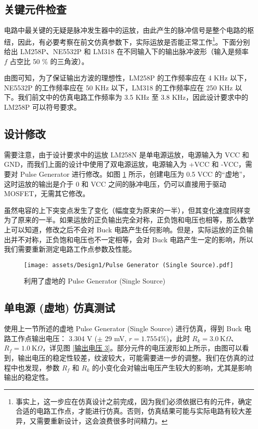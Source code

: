 \documentclass[UTF8]{article}
\def\kO{\ \mathrm{K}\Omega}
\def\kO{\ \mathrm{K}\Omega}
\theoremstyle{MyLineTheoremStyle} %
\theoremstyle{MyBlockTheoremStyle} %
\theoremstyle{MySubsubsectionStyle} %
\begin{document}
\subsection{关键元件检查}
电路中最关键的无疑是脉冲发生器中的运放，由此产生的脉冲信号是整个电路的枢纽，因此，有必要考察在前文仿真参数下，实际运放是否能正常工作\footnote{事实上，这一步应在仿真设计之前完成，因为我们必须依据已有的元件，确定合适的电路工作点，才能进行仿真。否则，仿真结果可能与实际电路有较大差异，又需要重新设计，这会浪费很多时间精力。}。下面分别给出 LM258P、NE5532P 和 LM318 在不同输入下的输出脉冲波形（输入是频率 $f$ 占空比 50 \% 的三角波）。


由图可知，为了保证输出方波的理想性，LM258P 的工作频率应在 4 KHz 以下，NE5532P 的工作频率应在 50 KHz 以下，LM318 的工作频率应在 250 KHz 以下。我们前文中的仿真电路工作频率为 3.5 KHz 至 3.8 KHz，因此设计要求中的 LM258P 可以符号要求。

\subsection{设计修改}

需要注意，由于设计要求中的运放 LM258N 是单电源运放，电源输入为 VCC 和 GND，而我们上面的设计中使用了双电源运放，电源输入为 +VCC 和 -VCC，需要对 Pulse Generator 进行修改。如图 \ref{Pulse Generator (Single Source)} 所示，创建电压为 0.5 VCC 的“虚地”，这时运放的输出是介于 0 和 VCC 之间的脉冲电压，仍可以直接用于驱动 MOSFET，无需其它修改。

虽然电容的上下突变点发生了变化（幅度变为原来的一半），但其变化速度同样变为了原来的一半。如果运放的正负输出完全对称，正负饱和电压也相等，那么数学上可以知道，修改之后不会对 Buck 电路产生任何影响。但是，实际运放的正负输出并不对称，正负饱和电压也不一定相等，会对 Buck 电路产生一定的影响，所以我们需要重新测定电路工作点参数及性能。

\begin{figure}[H]\centering
    \texttt{[image: assets/Design1/Pulse Generator (Single Source).pdf]}
    \caption{利用了虚地的 Pulse Generator (Single Source)}
    \label{Pulse Generator (Single Source)}
\end{figure}

\subsection{单电源 (虚地) 仿真测试}

使用上一节所述的虚地 Pulse Generator (Single Source) 进行仿真，得到 Buck 电路工作点输出电压： 3.304 V ($\pm$ 29 mV, $r = 1.7554 \%$)，此时 $R_k = 3.0 \kO$、$R_f = 1.0 \kO$，详见图 \ref{输出电压 3}。部分元件的电压波形如上所示，由图可以看到，输出电压的稳定性较差，纹波较大，可能需要进一步的调整。我们在仿真的过程中也发现，参数 $R_f$ 和 $R_k$ 的小变化会对输出电压产生较大的影响，尤其是影响输出的稳定性。
\end{document}
